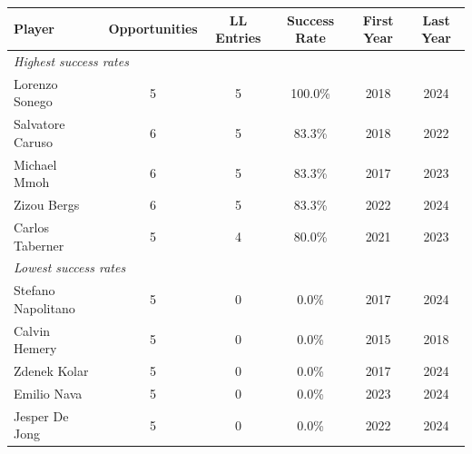 \begin{tabular}{lccccc}
\toprule
Player & Opportunities & LL Entries & Success Rate & First Year & Last Year \\
\midrule
\multicolumn{6}{l}{\textit{Highest success rates}} \\
Lorenzo Sonego & 5 & 5 & 100.0\% & 2018 & 2024 \\
Salvatore Caruso & 6 & 5 & 83.3\% & 2018 & 2022 \\
Michael Mmoh & 6 & 5 & 83.3\% & 2017 & 2023 \\
Zizou Bergs & 6 & 5 & 83.3\% & 2022 & 2024 \\
Carlos Taberner & 5 & 4 & 80.0\% & 2021 & 2023 \\
\midrule
\multicolumn{6}{l}{\textit{Lowest success rates}} \\
Stefano Napolitano & 5 & 0 & 0.0\% & 2017 & 2024 \\
Calvin Hemery & 5 & 0 & 0.0\% & 2015 & 2018 \\
Zdenek Kolar & 5 & 0 & 0.0\% & 2017 & 2024 \\
Emilio Nava & 5 & 0 & 0.0\% & 2023 & 2024 \\
Jesper De Jong & 5 & 0 & 0.0\% & 2022 & 2024 \\
\bottomrule
\end{tabular}
